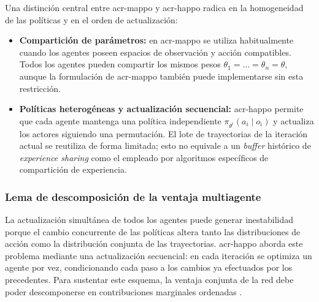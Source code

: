 Una distinción central entre \acrshort{acr-mappo} y \acrshort{acr-happo} radica en la homogeneidad de las políticas y en el orden de actualización:
\begin{itemize}
    \item \textbf{Compartición de parámetros:} en \acrshort{acr-mappo} se utiliza habitualmente cuando los agentes poseen espacios de observación y acción compatibles. Todos los agentes pueden compartir los mismos pesos $\theta_1 = \dots = \theta_n = \theta$, aunque la formulación de \acrshort{acr-mappo} también puede implementarse sin esta restricción.
    \item \textbf{Políticas heterogéneas y actualización secuencial:} \acrshort{acr-happo} permite que cada agente mantenga una política independiente $\pi_{\theta^i}(a_i \mid o_i)$ y actualiza los actores siguiendo una permutación. El lote de trayectorias de la iteración actual se reutiliza de forma limitada; esto no equivale a un \textit{buffer} histórico de \textit{experience sharing} como el empleado por algoritmos específicos de compartición de experiencia.
\end{itemize}

\subsubsection{Lema de descomposición de la ventaja multiagente}

La actualización simultánea de todos los agentes puede generar inestabilidad porque el cambio concurrente de las políticas altera tanto las distribuciones de acción como la distribución conjunta de las trayectorias. \acrshort{acr-happo} aborda este problema mediante una actualización secuencial: en cada iteración se optimiza un agente por vez, condicionando cada paso a los cambios ya efectuados por los precedentes. Para sustentar este esquema, la ventaja conjunta de la red debe poder descomponerse en contribuciones marginales ordenadas \cite{kuba2021trust}.


